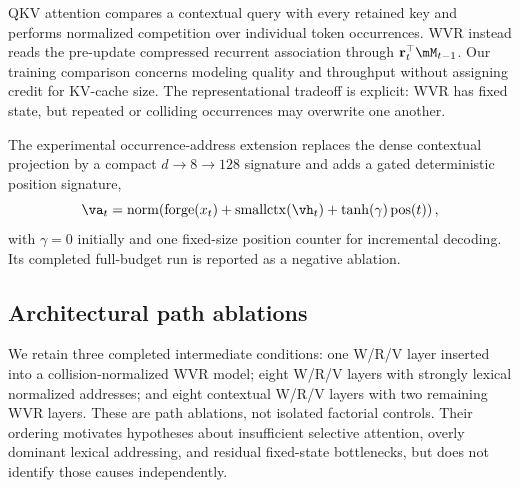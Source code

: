 QKV attention compares a contextual query with every retained key and performs normalized competition over individual token occurrences. WVR instead reads the pre-update compressed recurrent association through $\mathbf{r}_t^\top\mM_{t-1}$. Our training comparison concerns modeling quality and throughput without assigning credit for KV-cache size. The representational tradeoff is explicit: WVR has fixed state, but repeated or colliding occurrences may overwrite one another.

The experimental occurrence-address extension replaces the dense contextual projection by a compact $d\rightarrow8\rightarrow128$ signature and adds a gated deterministic position signature,
\begin{equation}
    \va_t=\operatorname{norm}\!\left(
    \operatorname{forge}(x_t)+\operatorname{smallctx}(\vh_t)
    +\tanh(\gamma)\operatorname{pos}(t)\right),
\end{equation}
with $\gamma=0$ initially and one fixed-size position counter for incremental decoding. Its completed full-budget run is reported as a negative ablation.

\subsection{Architectural path ablations}

We retain three completed intermediate conditions: one W/R/V layer inserted into a collision-normalized WVR model; eight W/R/V layers with strongly lexical normalized addresses; and eight contextual W/R/V layers with two remaining WVR layers. These are path ablations, not isolated factorial controls. Their ordering motivates hypotheses about insufficient selective attention, overly dominant lexical addressing, and residual fixed-state bottlenecks, but does not identify those causes independently.
